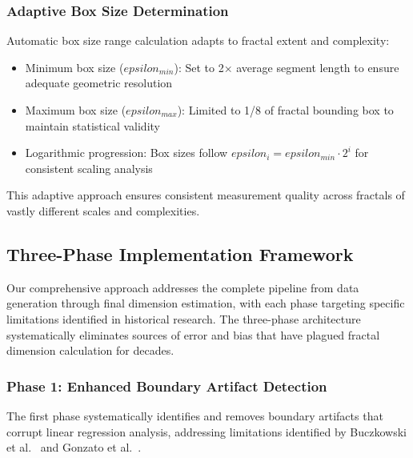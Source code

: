 \documentclass[preprint,12pt]{elsarticle}
\def\textbf#1{#1}%
\def\epsilon{epsilon}%
\begin{document}
\subsubsection{Adaptive Box Size Determination}

Automatic box size range calculation adapts to fractal extent and complexity:

\begin{itemize}
\item \textbf{Minimum box size ($\epsilon_{min}$)}: Set to 2× average segment length to ensure adequate geometric resolution
\item \textbf{Maximum box size ($\epsilon_{max}$)}: Limited to 1/8 of fractal bounding box to maintain statistical validity
\item \textbf{Logarithmic progression}: Box sizes follow $\epsilon_i = \epsilon_{min} \cdot 2^i$ for consistent scaling analysis
\end{itemize}

This adaptive approach ensures consistent measurement quality across fractals of vastly different scales and complexities.

\subsection{Three-Phase Implementation Framework}

Our comprehensive approach addresses the complete pipeline from data generation through final dimension estimation, with each phase targeting specific limitations identified in historical research. The three-phase architecture systematically eliminates sources of error and bias that have plagued fractal dimension calculation for decades.

\subsubsection{Phase 1: Enhanced Boundary Artifact Detection}

The first phase systematically identifies and removes boundary artifacts that corrupt linear regression analysis, addressing limitations identified by Buczkowski et al.~\cite{buczkowski1998} and Gonzato et al.~\cite{gonzato1998}.
\end{document}
